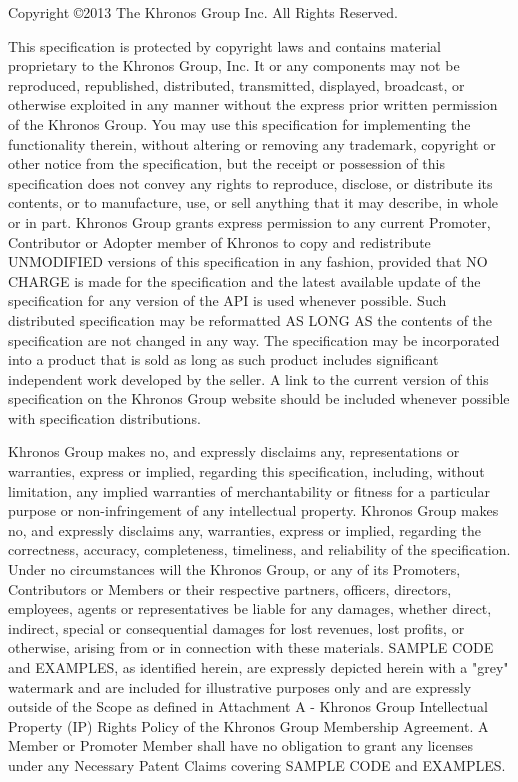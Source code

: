 \documentclass[oneside]{book}
\begin{document}
\begin{copyrightpage}
Copyright \copyright 2013 The Khronos Group Inc. All Rights Reserved.

This specification is protected by copyright laws and contains material proprietary to the
Khronos Group, Inc. It or any components may not be reproduced, republished,
distributed, transmitted, displayed, broadcast, or otherwise exploited in any manner
without the express prior written permission of the Khronos Group. You may use this
specification for implementing the functionality therein, without altering or removing any
trademark, copyright or other notice from the specification, but the receipt or possession
of this specification does not convey any rights to reproduce, disclose, or distribute its
contents, or to manufacture, use, or sell anything that it may describe, in whole or in part.
Khronos Group grants express permission to any current Promoter, Contributor or
Adopter member of Khronos to copy and redistribute UNMODIFIED versions of this
specification in any fashion, provided that NO CHARGE is made for the specification
and the latest available update of the specification for any version of the API is used
whenever possible. Such distributed specification may be reformatted AS LONG AS the
contents of the specification are not changed in any way. The specification may be
incorporated into a product that is sold as long as such product includes significant
independent work developed by the seller. A link to the current version of this
specification on the Khronos Group website should be included whenever possible with
specification distributions.

Khronos Group makes no, and expressly disclaims any, representations or warranties,
express or implied, regarding this specification, including, without limitation, any implied
warranties of merchantability or fitness for a particular purpose or non-infringement of
any intellectual property. Khronos Group makes no, and expressly disclaims any,
warranties, express or implied, regarding the correctness, accuracy, completeness,
timeliness, and reliability of the specification. Under no circumstances will the Khronos
Group, or any of its Promoters, Contributors or Members or their respective partners,
officers, directors, employees, agents or representatives be liable for any damages,
whether direct, indirect, special or consequential damages for lost revenues, lost profits,
or otherwise, arising from or in connection with these materials.
SAMPLE CODE and EXAMPLES, as identified herein, are expressly depicted herein
with a "grey" watermark and are included for illustrative purposes only and are expressly
outside of the Scope as defined in Attachment A - Khronos Group Intellectual Property
(IP) Rights Policy of the Khronos Group Membership Agreement. A Member or
Promoter Member shall have no obligation to grant any licenses under any Necessary
Patent Claims covering SAMPLE CODE and EXAMPLES.

\end{copyrightpage}
\tableofcontents
{}
\hypersetup{pageanchor=true,citecolor=blue}
\end{document}
